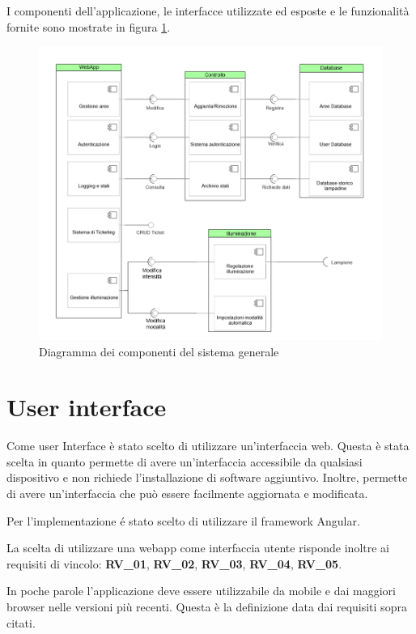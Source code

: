 I componenti dell'applicazione, le interfacce utilizzate ed esposte e le funzionalità fornite sono mostrate in figura \ref{fig:componenti_generali}.

\begin{figure}[ht]
    \centering
    \includegraphics[width=\textwidth]{img/componenti_generali.png}
    \caption{Diagramma dei componenti del sistema generale}
    \label{fig:componenti_generali}
\end{figure}

\section{User interface}

Come user Interface è stato scelto di utilizzare un'interfaccia web. Questa è stata scelta in quanto permette di avere un'interfaccia accessibile da qualsiasi dispositivo e non richiede l'installazione di software aggiuntivo. Inoltre, permette di avere un'interfaccia che può essere facilmente aggiornata e modificata.

Per l'implementazione é stato scelto di utilizzare il framework Angular.

La scelta di utilizzare una webapp come interfaccia utente risponde inoltre ai requisiti di vincolo: \textbf{RV\_01}, \textbf{RV\_02}, \textbf{RV\_03}, \textbf{RV\_04}, \textbf{RV\_05}.

In poche parole l'applicazione deve essere utilizzabile da mobile e dai maggiori browser nelle versioni più recenti. Questa è la definizione data dai requisiti sopra citati.

